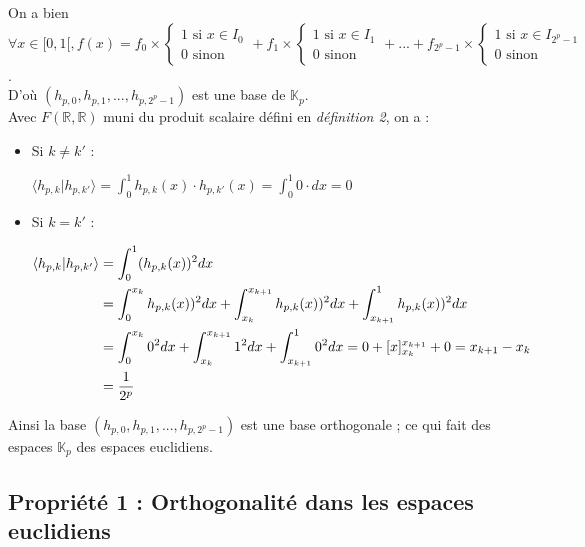 \documentclass{article}
\begin{document}
On a bien $\forall x \in [0,1[, f(x) = f_0 \times \begin{cases} 1 \text{ si } x \in I_0 \\ 0 \text{ sinon } \end{cases}
+ f_1 \times \begin{cases} 1 \text{ si } x \in I_1 \\ 0 \text{ sinon } \end{cases}
+ ... +
f_{2^p - 1} \times \begin{cases} 1 \text{ si } x \in I_{2^p - 1} \\ 0 \text{ sinon } \end{cases} $.\\

D'où $(h_{p,0},h_{p,1},...,h_{p,2^p -1})$ est une base de $\mathbb{K}_p$.\\



Avec $F(\mathbb{R},\mathbb{R})$ muni du produit scalaire défini en \textit{définition 2}, on a : \\

\begin{itemize}

\item Si $k \neq k'$ :

$\displaystyle \langle h_{p,k}|h_{p,k'} \rangle = \int_{0}^{1} h_{p,k}(x)\cdot{}h_{p,k'}(x) = \int_0^1 0\cdot{}dx = 0$ \\

\item Si $k = k'$ :

\begin{align*} \displaystyle
\langle h_{p,k}|h_{p,k'} \rangle &= \int_{0}^{1} (h_{p,k}(x))^2 dx \\
 &= \int_{0}^{x_k} h_{p,k}(x))^2 dx + \int_{x_k}^{x_{k+1}} h_{p,k}(x))^2 dx + \int_{x_{k+1}}^{1} h_{p,k}(x))^2 dx  \\
\displaystyle &= \int_0^{x_k} 0^2 dx + \int_{x_k}^{x_{k+1}} 1^2 dx + \int_{x_{k+1}}^{1} 0^2 dx = 0 + [x]_{x_k}^{x_{k+1}} + 0 = x_{k+1} - x_k  \\
\displaystyle &= \frac{1}{2^p} \\
\end{align*} 
\end{itemize}

Ainsi la base $(h_{p,0},h_{p,1},...,h_{p,2^p -1})$ est une base orthogonale ; ce qui fait des espaces $\mathbb{K}_p$ des espaces euclidiens.


\subsection{Propriété 1 : Orthogonalité dans les espaces euclidiens}
\end{document}
